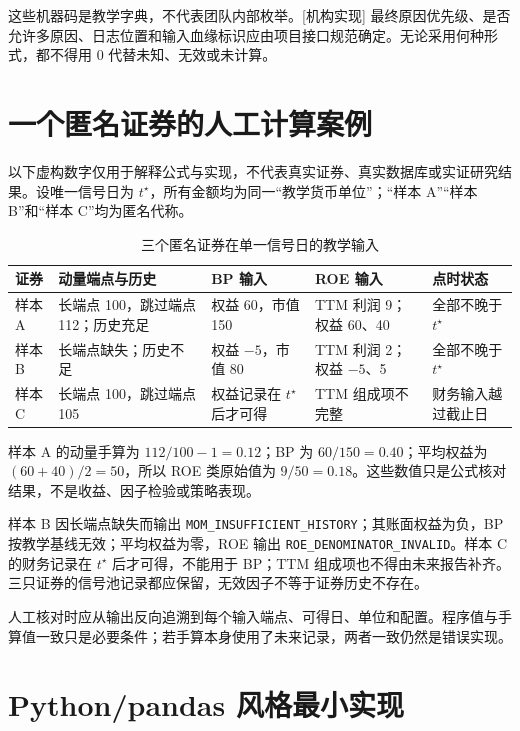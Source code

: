 这些机器码是教学字典，不代表团队内部枚举。[机构实现] 最终原因优先级、是否允许多原因、日志位置和输入血缘标识应由项目接口规范确定。无论采用何种形式，都不得用 \(0\) 代替未知、无效或未计算。

\section{一个匿名证券的人工计算案例}

以下虚构数字仅用于解释公式与实现，不代表真实证券、真实数据库或实证研究结果。设唯一信号日为 \(t^\star\)，所有金额均为同一“教学货币单位”；“样本 A”“样本 B”和“样本 C”均为匿名代称。

\begin{table}[htbp]
  \centering
  \small
  \caption{三个匿名证券在单一信号日的教学输入}
  \label{tab:ch04-toy-inputs}
  \begin{tabularx}{\textwidth}{p{1.7cm} p{3.4cm} p{3.2cm} p{3.6cm} Y}
    \toprule
    证券 & 动量端点与历史 & BP 输入 & ROE 输入 & 点时状态 \\
    \midrule
    样本 A & 长端点 100，跳过端点 112；历史充足 & 权益 60，市值 150 & TTM 利润 9；权益 60、40 & 全部不晚于 \(t^\star\) \\
    样本 B & 长端点缺失；历史不足 & 权益 \(-5\)，市值 80 & TTM 利润 2；权益 \(-5\)、5 & 全部不晚于 \(t^\star\) \\
    样本 C & 长端点 100，跳过端点 105 & 权益记录在 \(t^\star\) 后才可得 & TTM 组成项不完整 & 财务输入越过截止日 \\
    \bottomrule
  \end{tabularx}
\end{table}

\begin{casebox}
样本 A 的动量手算为 \(112/100-1=0.12\)；BP 为 \(60/150=0.40\)；平均权益为 \((60+40)/2=50\)，所以 ROE 类原始值为 \(9/50=0.18\)。这些数值只是公式核对结果，不是收益、因子检验或策略表现。

样本 B 因长端点缺失而输出
\texttt{MOM\_INSUFFICIENT\_HISTORY}；其账面权益为负，BP 按教学基线无效；平均权益为零，ROE 输出
\texttt{ROE\_DENOMINATOR\_INVALID}。样本 C 的财务记录在 \(t^\star\) 后才可得，不能用于 BP；TTM 组成项也不得由未来报告补齐。三只证券的信号池记录都应保留，无效因子不等于证券历史不存在。
\end{casebox}

人工核对时应从输出反向追溯到每个输入端点、可得日、单位和配置。程序值与手算值一致只是必要条件；若手算本身使用了未来记录，两者一致仍然是错误实现。

\section{Python/pandas 风格最小实现}


